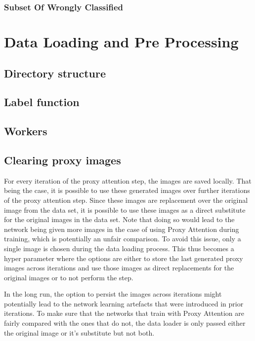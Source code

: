\subsubsection{Subset Of Wrongly Classified}

\section{Data Loading and Pre Processing}
\subsection{Directory structure}

\subsection{Label function}

\subsection{Workers}

\subsection{Clearing proxy images} \label{sec:clearing_proxy_images}
For every iteration of the proxy attention step, the images are saved locally. That being the case, it is possible to use these generated images over further iterations of the proxy attention step. Since these images are replacement over the original image from the data set, it is possible to use these images as a direct substitute for the original images in the data set. Note that doing so would lead to the network being given more images in the case of using Proxy Attention during training, which is potentially an unfair comparison. To avoid this issue, only a single image is chosen during the data loading process. This thus becomes a hyper parameter where the options are either to store the last generated proxy images across iterations and use those images as direct replacements for the original images or to not perform the step. 

In the long run, the option to persist the images across iterations might potentially lead to the network learning artefacts that were introduced in prior iterations. To make sure that the networks that train with Proxy Attention are fairly compared with the ones that do not, the data loader is only passed either the original image or it's substitute but not both. 

